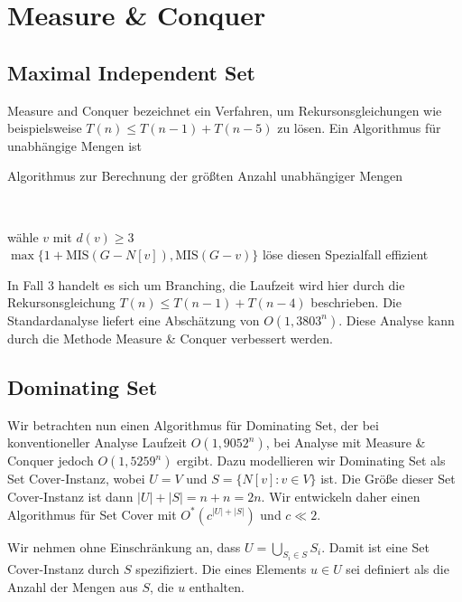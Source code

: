 \chapter{Measure \& Conquer}

\section{Maximal Independent Set}
  Measure and Conquer bezeichnet ein Verfahren, um Rekursonsgleichungen wie beispielsweise \(T(n) \leq T(n-1) + T(n-5)\) zu lösen. Ein Algorithmus für unabhängige Mengen ist

  \begin{algorithm}[H]
    \caption{Algorithmus zur Berechnung der größten Anzahl unabhängiger Mengen}
  
     \\

     {
      wähle \(v\) mit \(d(v) \geq 3\) \\
      \Return \(\max \{ 1 + \text{MIS}(G - N[v]), \text{MIS}(G-v) \}\) 
    } {
      löse diesen Spezialfall effizient
    }
  \end{algorithm}

  In Fall 3 handelt es sich um Branching, die Laufzeit wird hier durch die Rekursonsgleichung \(T(n) \leq T(n-1) + T(n-4)\) beschrieben. Die Standardanalyse liefert eine Abschätzung von \(O(1{,}3803^n)\). Diese Analyse kann durch die Methode Measure \& Conquer verbessert werden.

\section{Dominating Set}
  Wir betrachten nun einen Algorithmus für Dominating Set, der bei konventioneller Analyse Laufzeit \(O(1{,}9052^n)\), bei Analyse mit Measure \& Conquer jedoch \(O(1{,}5259^n)\) ergibt. Dazu modellieren wir Dominating Set als Set Cover-Instanz, wobei \(U = V\) und \(S = \{ N[v] : v \in V \}\) ist. Die Größe dieser Set Cover-Instanz ist dann \(|U| + |S| = n + n = 2n\). Wir entwickeln daher einen Algorithmus für Set Cover mit \(O^*(c^{|U|+|S|})\) und \(c \ll 2\).

  Wir nehmen ohne Einschränkung an, dass \(U = \bigcup_{S_i \in S} S_i\). Damit ist eine Set Cover-Instanz durch \(S\) spezifiziert. Die  eines Elements \(u \in U\) sei definiert als die Anzahl der Mengen aus \(S\), die \(u\) enthalten.

